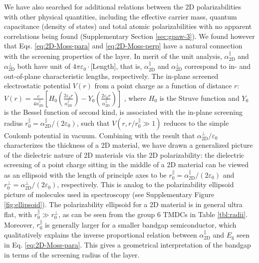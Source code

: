 \documentclass[journal=ancac3,manuscript=article,email=true,hyperref=true,keywords=false]{achemso}
\begin{document}
We have also searched for additional relations between the 2D
polarizabilities with other physical quantities, including the
effective carrier mass, quantum capacitance (density of states) and
total atomic polarizabilities with no apparent correlations being
found (Supplementary Section \ref{sec:gpaw-3}).  We found however that
Eqs. \ref{eq:2D-Moss-para} and \ref{eq:2D-Moss-perp} have a natural
connection with the screening properties of the layer.
%
In merit of the unit analysis,
$\alpha_{\mathrm{2D}}^{\parallel}$ and $\alpha_{\mathrm{2D}}^{\perp}$
both have unit of $4\pi\varepsilon_{0} \cdot$[Length], that is, $\alpha_{\mathrm{2D}}^{\parallel}$ and
$\alpha_{\mathrm{2D}}^{\perp}$ correspond to in- and out-of-plane
characteristic lengths, respectively. The in-plane screened
electrostatic potential $V(r)$ from a point charge as
a function of distance $r$: 
$V(r) = {\displaystyle \frac{e}{4 \alpha_{\mathrm{2D}}^{\parallel}}}
\left[H_{0}({\displaystyle \frac{2\varepsilon_{0}
      r}{\alpha_{\mathrm{2D}}^{\parallel}}}) - Y_{0}( {\displaystyle
    \frac{2
      \varepsilon_{0}r}{\alpha_{\mathrm{2D}}^{\parallel}}})\right]$
\cite{Keldysh_1979_eps_multi,Pulci_2014}, where $H_{0}$ is the Struve
function and $Y_{0}$ is the Bessel function of second kind, is
associated with the in-plane screening radius
$r_{0}^{\parallel}=\alpha_{\mathrm{2D}}^{\parallel}/(2
\varepsilon_{0})$, such that $V(r,r/r^{\parallel}_{0} \gg 1)$ reduces
to the simple Coulomb potential in vacuum. Combining with the result
that $\alpha_{\mathrm{2D}}^{\perp}/\varepsilon_{0}$ characterizes the
thickness of a 2D material, we have drawn a generalized picture of the
dielectric nature of 2D materials via the 2D polarizability: the
dielectric screening of a point charge sitting in the middle of a 2D
material can be viewed as an ellipsoid with the length of principle
axes to be
$r_{0}^{\parallel} = \alpha_{\mathrm{2D}}^{\parallel}/(2
\varepsilon_{0})$ and
$r_{0}^{\perp} = \alpha^{\perp}_{\mathrm{2D}}/(2 \varepsilon_{0})$,
respectively. This is analog to the polarizability ellipsoid picture of
molecules used in spectroscopy \cite{Banwell_1994} (see Supplementary
Figure \ref{fig:ellipsoid}). The polarizability ellipsoid for a 2D
material is in general ultra flat, with
$r_{0}^{\parallel} \gg r_{0}^{\perp}$, as can be seen from the group 6
TMDCs in Table \ref{tbl:radii}.  Moreover,
$r_{0}^{\parallel}$ is generally larger for a smaller bandgap
semiconductor, which qualitatively explains the inverse proportional
relation between $\alpha_{\mathrm{2D}}^{\parallel}$ and
$E_{\mathrm{g}}$ seen in Eq. \ref{eq:2D-Moss-para}. 
This gives a geometrical interpretation of the bandgap in terms 
of the screening radius of the layer. 
\end{document}
